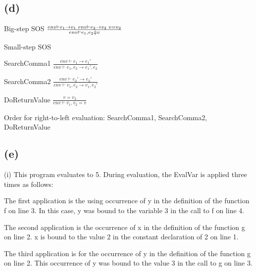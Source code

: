 \documentclass[11pt, oneside]{article}
\newcommand{\forceindent}{\leavevmode{\parindent=1.5em\indent}}
\begin{document}
\subsection*{(d)}
\forceindent \par Big-step SOS
$
\frac{
	env \vdash e_1 \rightarrow v_1 \thinspace \thinspace env \vdash e_2 \rightarrow v_2 \thinspace \thinspace v = v_2
}
{
	env \vdash e_1, e_2 \Downarrow v
}
$

\par Small-step SOS
\par SearchComma1
$
\frac{
	env \vdash e_1 \rightarrow e_1'
}
{
	env \vdash e_1, e_2 \rightarrow e_1', e_2
}
$
\par SearchComma2
$
\frac{
	env \vdash e_2' \rightarrow e_2'
}
{
	env \vdash v_1, e_2 \rightarrow v_1, e_2'
}
$
\par DoReturnValue
$
\frac{
	v = v_2
}
{
	env \vdash v_1, v_2 = v
}
$
\par Order for right-to-left evaluation: SearchComma1, SearchComma2, DoReturnValue

\subsection*{(e)}
\forceindent \par (i) This program evaluates to 5. During evaluation, the EvalVar is applied three times as follows:
\par The first application is the using occurrence of y in the definition of the function f on line 3. In this case, y was bound to the variable 3 in the call to f on line 4. 
\par The second application is the occurrence of x in the definition of the function g on line 2. x is bound to the value 2 in the constant declaration of 2 on line 1.
\par The third application is for the occurrence of y in the definition of the function g on line 2. This occurrence of y was bound to the value 3 in the call to g on line 3.
\end{document}

